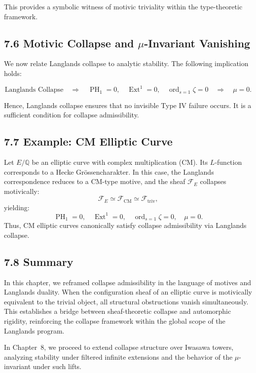 \documentclass[11pt]{article}
\DeclareMathOperator{\Ext}{Ext}
\DeclareMathOperator{\PH}{PH}
\newcommand{\ord}{\operatorname{ord}}
\begin{document}
This provides a symbolic witness of motivic triviality within the type-theoretic framework.

\subsection*{7.6 Motivic Collapse and \(\mu\)-Invariant Vanishing}

We now relate Langlands collapse to analytic stability. The following implication holds:

\[
\text{Langlands Collapse} \quad \Longrightarrow \quad \PH_1 = 0,\quad \Ext^1 = 0,\quad \ord_{s=1} \zeta = 0 \quad \Longrightarrow \quad \mu = 0.
\]

Hence, Langlands collapse ensures that no invisible Type IV failure occurs. It is a sufficient condition for collapse admissibility.

\subsection*{7.7 Example: CM Elliptic Curve}

Let \( E/\mathbb{Q} \) be an elliptic curve with complex multiplication (CM). Its \( L \)-function corresponds to a Hecke Grössencharakter. In this case, the Langlands correspondence reduces to a CM-type motive, and the sheaf \( \mathcal{F}_E \) collapses motivically:
\[
\mathcal{F}_E \simeq \mathcal{F}_{\mathrm{CM}} \simeq \mathcal{F}_{\text{triv}},
\]
yielding:
\[
\PH_1 = 0,\quad \Ext^1 = 0,\quad \ord_{s=1} \zeta = 0,\quad \mu = 0.
\]
Thus, CM elliptic curves canonically satisfy collapse admissibility via Langlands collapse.

\subsection*{7.8 Summary}

In this chapter, we reframed collapse admissibility in the language of motives and Langlands duality. When the configuration sheaf of an elliptic curve is motivically equivalent to the trivial object, all structural obstructions vanish simultaneously. This establishes a bridge between sheaf-theoretic collapse and automorphic rigidity, reinforcing the collapse framework within the global scope of the Langlands program.

In Chapter~8, we proceed to extend collapse structure over Iwasawa towers, analyzing stability under filtered infinite extensions and the behavior of the \(\mu\)-invariant under such lifts.
\end{document}
